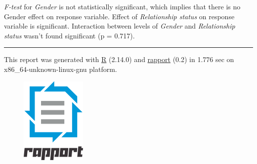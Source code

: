 \documentclass[]{article}
\makeatletter
\def\maxwidth{\ifdim\Gin@nat@width>\linewidth\linewidth
\else\Gin@nat@width\fi}
\let\Oldincludegraphics\includegraphics
\renewcommand{\includegraphics}[1]{\Oldincludegraphics[width=\maxwidth]{#1}}
\makeatother
\begin{document}
\emph{F-test} for \emph{Gender} is not statistically significant, which
implies that there is no Gender effect on response variable. Effect of
\emph{Relationship status} on response variable is significant.
Interaction between levels of \emph{Gender} and \emph{Relationship
status} wasn't found significant (p = 0.717).

\begin{center}\rule{3in}{0.4pt}\end{center}

This report was generated with \href{http://www.r-project.org/}{R}
(2.14.0) and \href{http://al3xa.github.com/rapport/}{rapport} (0.2) in
1.776 sec on x86\_64-unknown-linux-gnu platform.

\begin{figure}[htbp]
\centering
\includegraphics{images/logo.png}
\caption{}
\end{figure}
\end{document}
